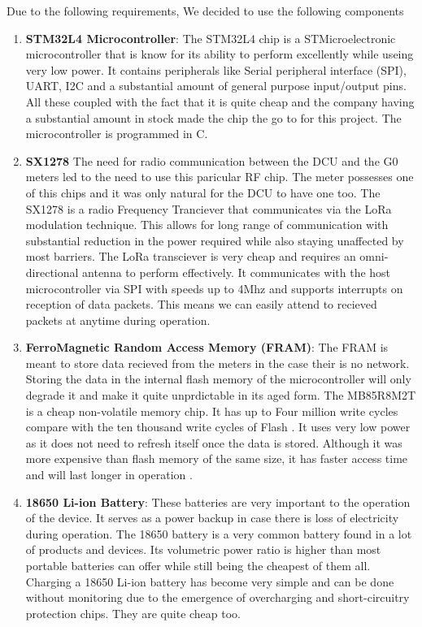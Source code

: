 Due to the following requirements, We decided to use the following components
\begin{enumerate}
\item \textbf{STM32L4 Microcontroller}: The STM32L4 chip is a STMicroelectronic microcontroller that is know for its ability to perform excellently while useing very low power. It contains peripherals like Serial peripheral interface (SPI), UART, I2C and a substantial amount of general purpose input/output pins. All these coupled with the fact that it is quite cheap and the company having a substantial amount in stock made the chip the go to for this project. The microcontroller is programmed in C.
\item \textbf{SX1278} The need for radio communication between the DCU and the G0 meters led to the need to use this paricular RF chip. The meter possesses one of this chips and it was only natural for the DCU to have one too. The SX1278 is a radio Frequency Tranciever that communicates via the LoRa modulation technique. This allows for long range of communication with substantial reduction in the power required while also staying unaffected by most barriers.  The LoRa transciever is very cheap and requires an omni-directional antenna to perform effectively. It communicates with the host microcontroller via SPI with speeds up to 4Mhz and supports interrupts on reception of data packets. This means we can easily attend to recieved packets at anytime during operation.

\item \textbf{FerroMagnetic Random Access Memory (FRAM)}: The FRAM is meant to store data recieved from the meters in the case their is no network. Storing the data in the internal flash memory of the microcontroller will only degrade it and make it quite unprdictable in its aged form. The MB85R8M2T is a cheap non-volatile memory chip. It has up to Four million write cycles compare with the ten thousand write cycles of Flash \citep{fram}. It uses very low power as it does not need to refresh itself once the data is stored. Although it was more expensive than flash memory of the same size, it has faster access time and will last longer in operation \citep{fram}. 

\item \textbf{18650 Li-ion Battery}: These batteries are very important to the operation of the device. It serves as a power backup in case there is loss of electricity during operation. The 18650 battery is a very common battery found in a lot of products and devices. Its volumetric power ratio is higher than most portable batteries can offer while still being the cheapest of them all. Charging a 18650 Li-ion battery has become very simple and can be done without monitoring due to the emergence of overcharging and short-circuitry protection chips.  They are quite cheap too. 


\end{enumerate}
